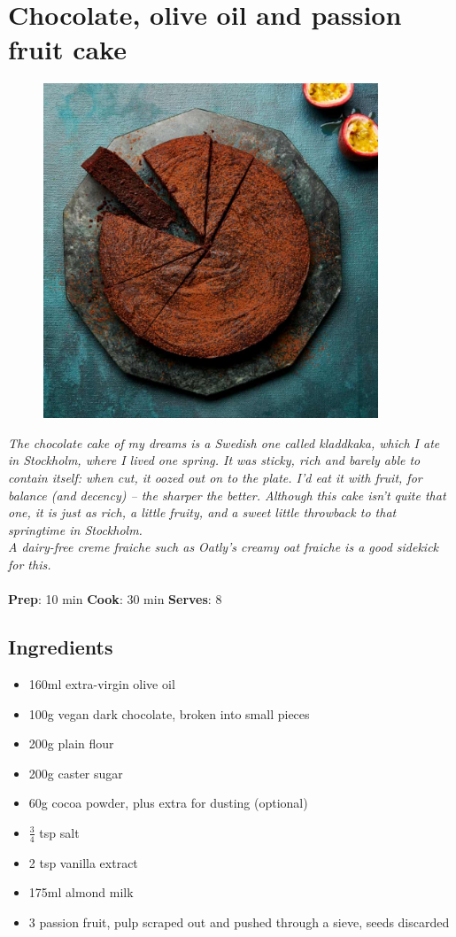 \documentclass{book}
\begin{document}
\section{Chocolate, olive oil and passion fruit cake}
\begin{figure}
\centering\includegraphics[width=10cm,height=10cm,keepaspectratio]{Recipe_Pictures/Chocolate,_olive_oil_and_passion_fruit_cake.png}
\end{figure}
\emph{The chocolate cake of my dreams is a Swedish one called kladdkaka, which I ate in Stockholm, where I lived one spring. It was sticky, rich and barely able to contain itself: when cut, it oozed out on to the plate. I’d eat it with fruit, for balance (and decency) – the sharper the better. Although this cake isn’t quite that one, it is just as rich, a little fruity, and a sweet little throwback to that springtime in Stockholm.\\ 
A dairy-free creme fraiche such as Oatly’s creamy oat fraiche is a good sidekick for this.}\\\\ 
\textbf{Prep}: 10 min
\textbf{Cook}: 30 min
\textbf{Serves}: 8
\subsection*{Ingredients}
\begin{itemize}
\item 160ml extra-virgin olive oil 
\item 100g vegan dark chocolate, broken into small pieces
\item 200g plain flour 
\item 200g caster sugar
\item 60g cocoa powder, plus extra for dusting (optional)
\item $\frac{3}{4}$ tsp salt 
\item 2 tsp vanilla extract 
\item 175ml almond milk 
\item 3 passion fruit, pulp scraped out and pushed through a sieve, seeds discarded
\end{itemize}
\end{document}
